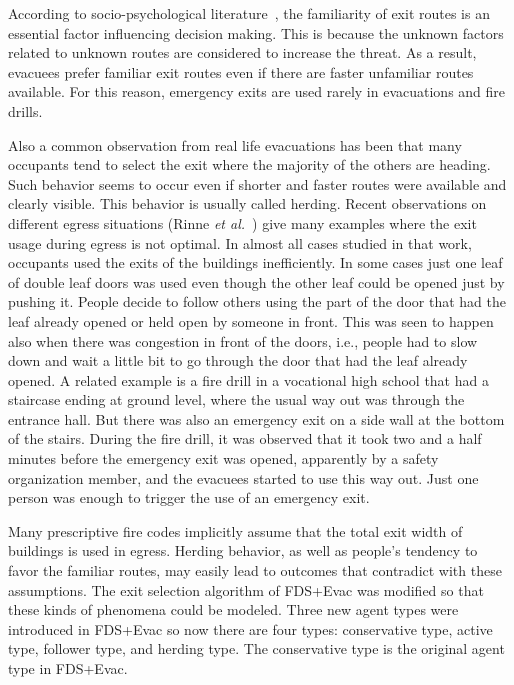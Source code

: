 \documentclass[12pt,a4paper,final,twoside]{stylevk}
\begin{document}
\noindent According to socio-psychological
literature~\cite{Pan06,Proulx1993}, the familiarity of exit routes is
an essential factor influencing decision making.  This is because the
unknown factors related to unknown routes are considered to increase
the threat.  As a result, evacuees prefer familiar exit routes even if
there are faster unfamiliar routes available.  For this reason,
emergency exits are used rarely in evacuations and fire drills.


Also a common observation from real life evacuations has been that
many occupants tend to select the exit where the majority of the
others are heading.  Such behavior seems to occur even if shorter and
faster routes were available and clearly visible. This behavior is
usually called herding. Recent observations on different egress
situations (Rinne \emph{et al.}~\cite{Rinne10}) give many examples
where the exit usage during egress is not optimal.  In almost all
cases studied in that work, occupants used the exits of the buildings
inefficiently.  In some cases just one leaf of double leaf doors was
used even though the other leaf could be opened just by pushing it.
People decide to follow others using the part of the door that had the
leaf already opened or held open by someone in front.  This was seen
to happen also when there was congestion in front of the doors, i.e.,
people had to slow down and wait a little bit to go through the door
that had the leaf already opened.  A related example is a fire drill
in a vocational high school that had a staircase ending at ground
level, where the usual way out was through the entrance hall.  But
there was also an emergency exit on a side wall at the bottom of the
stairs.  During the fire drill, it was observed that it took two and a
half minutes before the emergency exit was opened, apparently by a
safety organization member, and the evacuees started to use this way
out.  Just one person was enough to trigger the use of an emergency
exit.


Many prescriptive fire codes implicitly assume that the total exit
width of buildings is used in egress.  Herding behavior, as well as
people's tendency to favor the familiar routes, may easily lead to
outcomes that contradict with these assumptions.  The exit selection
algorithm of FDS+Evac was modified so that these kinds of phenomena
could be modeled.  Three new agent types were introduced in FDS+Evac
so now there are four types: conservative type, active type, follower
type, and herding type.  The conservative type is the original agent
type in FDS+Evac.
\end{document}
